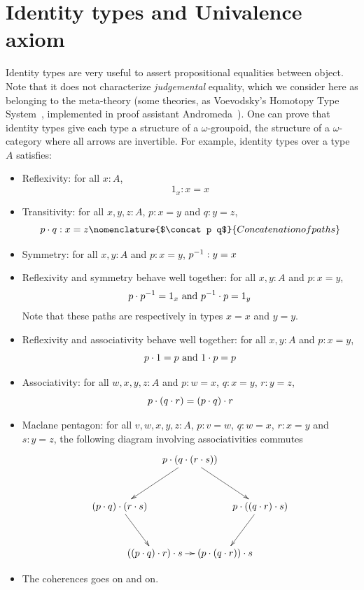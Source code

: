 \section{Identity types and Univalence axiom}
\label{sec:ua}

Identity types are very useful to assert propositional equalities
between object. Note that it does not characterize {\em judgemental}
equality, which we consider here as belonging to the meta-theory (some
theories, as Voevodsky's Homotopy Type System~\cite{hts}, implemented
in proof assistant Andromeda~\cite{andromeda}). 
One can prove that identity types give each type a structure of a
$\omega$-groupoid, \ie{} the structure of a $\omega$-category where
all arrows are invertible. For example, identity types over a type $A$
satisfies:

\begin{itemize}
\item Reflexivity: for all $x:A$, \[1_x:x=x\]
\item Transitivity: for all $x,y,z:A$, $p:x=y$ and $q:y= z$, \[\concat p
 q: x = z\nomenclature{$\concat p q$}{Concatenation of paths}\]
\item Symmetry: for all $x,y:A$ and $p:x=y$, $p^{-1}:
  y=x$
\item Reflexivity and symmetry behave well together: for all $x,y:A$
  and $p:x=y$, \[p\cdot p^{-1} = 1_x\text{ and } p^{-1}\cdot p = 1_y\]
  Note that these paths are respectively in types $x=x$ and $y=y$.
\item Reflexivity and associativity behave well together: for all
  $x,y:A$ and $p:x=y$, 
  \[p\cdot 1 = p \text{ and } 1\cdot p = p\]
\item Associativity: for all $w,x,y,z:A$ and $p:w=x$, $q:x=y$,
  $r:y=z$,
  \[p\cdot (q\cdot r) = (p\cdot q)\cdot r\]
\item Maclane pentagon: for all $v,w,x,y,z:A$, $p:v=w$, $q:w=x$, $r:x=y$ and
  $s:y=z$, the following diagram involving associativities commutes
\[
  \xymatrix @!0 @R=4pc @C=3pc {
    && \concat p {(\concat q {(\concat r s)})} \ar[dll] \ar[drr]&& \\
    \concat {(\concat p q)} {(\concat r s)}\ar[dr] &&&& \concat p {(\concat
      {(\concat q r)} s)}\ar[ld] \\
    & \concat {(\concat {(\concat p q)} r)} \ar[rr] s && \concat {(\concat p
      {(\concat q r)})} s &
  }
\]
\item The coherences goes on and on.
\end{itemize}

